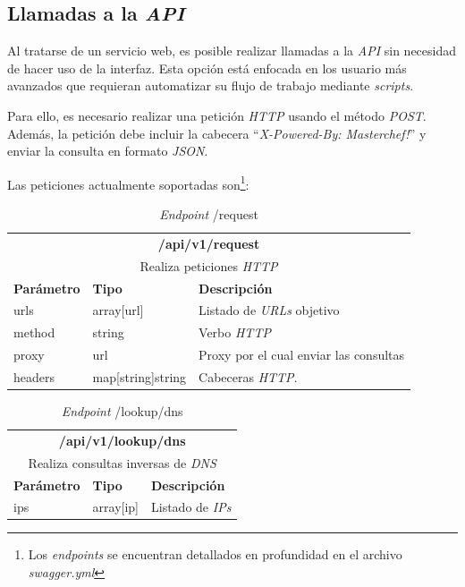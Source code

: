 \subsection{Llamadas a la \textit{API}} \label{sub:apicalls}

Al tratarse de un servicio web, es posible realizar llamadas a la \textit{API} sin necesidad de hacer uso de la interfaz. Esta opción está enfocada en los usuario más avanzados que requieran automatizar su flujo de trabajo mediante \textit{scripts}.\sn

Para ello, es necesario realizar una petición \textit{HTTP} usando el método \textit{POST}. Además, la petición debe incluir la cabecera ``\textit{X-Powered-By: Masterchef!}'' y enviar la consulta en formato \textit{JSON}.\sn

Las peticiones actualmente soportadas son\footnote{Los \textit{endpoints} se encuentran detallados en profundidad en el archivo \textit{swagger.yml}}:

\begin{table}[H]
    \begin{center}
        \begin{tabularx}{\textwidth}{| l | l | X |}
            \hline
            \multicolumn{3}{c}{ \textbf{/api/v1/request} } \\
            \multicolumn{3}{c}{Realiza peticiones \textit{HTTP}} \\ \hline
            \textbf{Parámetro} & \textbf{Tipo} & \textbf{Descripción} \\ \hline
            urls & array[url] & Listado de \textit{URLs} objetivo \\ \hline
            method & string & Verbo \textit{HTTP} \\ \hline
            proxy & url & Proxy por el cual enviar las consultas \\ \hline
            headers & map[string]string & Cabeceras \textit{HTTP}. \\ \hline
        \end{tabularx}
    \end{center}
    \caption{\textit{Endpoint} /request}
    \label{tab:endpointrequest}
\end{table}

\begin{table}[H]
    \begin{center}
        \begin{tabularx}{\textwidth}{| l | l | X |}
            \hline
            \multicolumn{3}{c}{ \textbf{/api/v1/lookup/dns} } \\
            \multicolumn{3}{c}{Realiza consultas inversas de \textit{DNS}} \\ \hline
            \textbf{Parámetro} & \textbf{Tipo} & \textbf{Descripción} \\ \hline
            ips & array[ip] & Listado de \textit{IPs} \\ \hline
        \end{tabularx}
    \end{center}
    \caption{\textit{Endpoint} /lookup/dns}
    \label{tab:endpointdns}
\end{table}

